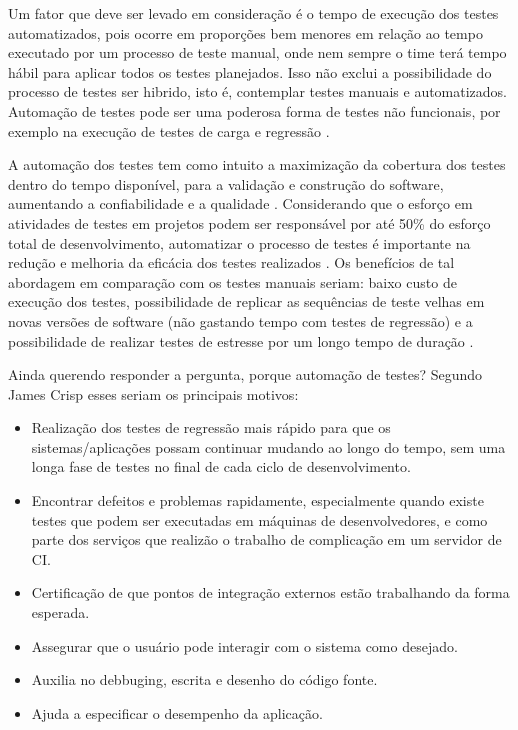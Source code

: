 Um fator que deve ser levado em consideração é  o tempo de execução dos testes automatizados, pois ocorre em proporções bem menores em relação ao tempo executado por um processo de teste manual, onde nem sempre o time terá tempo hábil para aplicar todos os testes planejados. Isso não exclui a possibilidade do processo de testes ser hibrido, isto é, contemplar testes manuais e automatizados. Automação de testes pode ser uma poderosa forma de testes não funcionais, por exemplo na execução de testes de carga e regressão \cite{Bret1999}.

A automação dos testes tem como intuito a maximização da cobertura dos testes dentro do tempo disponível, para a validação e construção do software, aumentando a confiabilidade e a qualidade \cite{Wissink206}. Considerando que o esforço em atividades de testes em projetos podem ser responsável por até 50\% do esforço total de desenvolvimento, automatizar o processo de testes é importante na redução e melhoria da eficácia dos testes realizados \cite{Budnik2010}. Os benefícios de tal abordagem em comparação com os testes manuais seriam: baixo custo de execução dos testes, possibilidade de replicar as sequências de teste velhas em novas versões de software (não gastando tempo com testes de regressão) e a possibilidade de realizar testes de estresse por um longo tempo de duração \cite{Wissink206}.

Ainda querendo responder a pergunta, porque automação de testes? Segundo James Crisp \cite{James2012} esses seriam os principais motivos:
\begin{itemize}
	\item Realização dos testes de regressão mais rápido para que os sistemas/aplicações possam continuar mudando ao longo do tempo, sem uma longa fase de testes no final de cada ciclo de desenvolvimento.
	\item Encontrar defeitos e problemas rapidamente, especialmente quando existe testes que podem ser executadas em máquinas de desenvolvedores, e como parte dos serviços que realizão o trabalho de complicação em um servidor de CI.
	\item Certificação de que pontos de integração externos estão trabalhando da forma esperada.
	\item Assegurar que o usuário pode interagir com o sistema como desejado.
	\item Auxilia no debbuging, escrita e desenho do código fonte.
	\item Ajuda a especificar o desempenho da aplicação.
\end{itemize}

